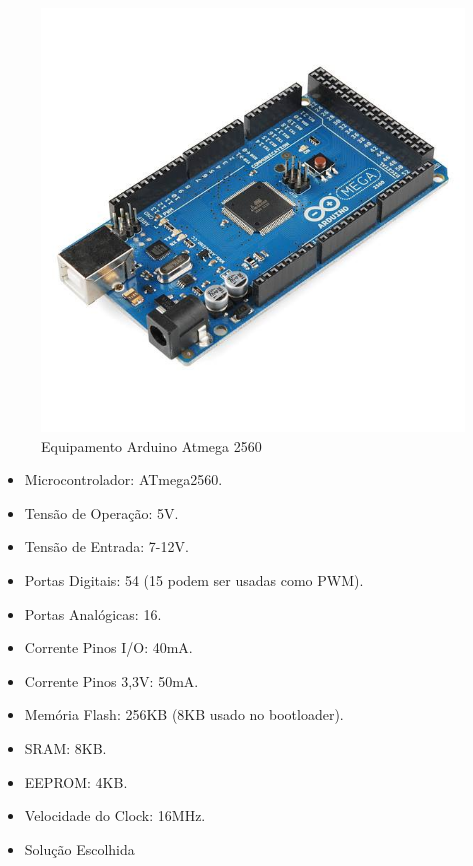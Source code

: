 \begin{figure}[!h]
\centering
\includegraphics[scale=0.65, angle = 360]{figuras/lala4}
\caption[]{Equipamento Arduino Atmega 2560}
\end{figure}
\FloatBarrier

\begin{itemize}
\item Microcontrolador: ATmega2560.
\item Tensão de Operação: 5V.
\item Tensão de Entrada: 7-12V.
\item Portas Digitais: 54 (15 podem ser usadas como PWM).
\item Portas Analógicas: 16.
\item Corrente Pinos I/O: 40mA.
\item Corrente Pinos 3,3V: 50mA.
\item Memória Flash: 256KB (8KB usado no bootloader).
\item SRAM: 8KB.
\item EEPROM: 4KB.
\item Velocidade do Clock: 16MHz.
\end{itemize}

\begin{itemize}
\item{Solução Escolhida}
\end{itemize}

